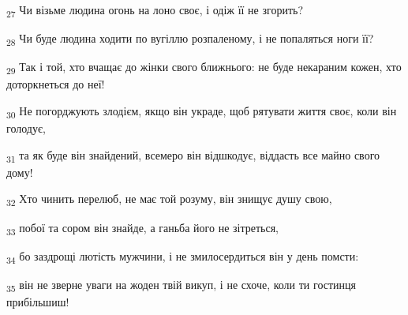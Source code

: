\begin{tcolorbox}
\textsubscript{27} Чи візьме людина огонь на лоно своє, і одіж її не згорить?
\end{tcolorbox}
\begin{tcolorbox}
\textsubscript{28} Чи буде людина ходити по вугіллю розпаленому, і не попаляться ноги її?
\end{tcolorbox}
\begin{tcolorbox}
\textsubscript{29} Так і той, хто вчащає до жінки свого ближнього: не буде некараним кожен, хто доторкнеться до неї!
\end{tcolorbox}
\begin{tcolorbox}
\textsubscript{30} Не погорджують злодієм, якщо він украде, щоб рятувати життя своє, коли він голодує,
\end{tcolorbox}
\begin{tcolorbox}
\textsubscript{31} та як буде він знайдений, всемеро він відшкодує, віддасть все майно свого дому!
\end{tcolorbox}
\begin{tcolorbox}
\textsubscript{32} Хто чинить перелюб, не має той розуму, він знищує душу свою,
\end{tcolorbox}
\begin{tcolorbox}
\textsubscript{33} побої та сором він знайде, а ганьба його не зітреться,
\end{tcolorbox}
\begin{tcolorbox}
\textsubscript{34} бо заздрощі лютість мужчини, і не змилосердиться він у день помсти:
\end{tcolorbox}
\begin{tcolorbox}
\textsubscript{35} він не зверне уваги на жоден твій викуп, і не схоче, коли ти гостинця прибільшиш!
\end{tcolorbox}
